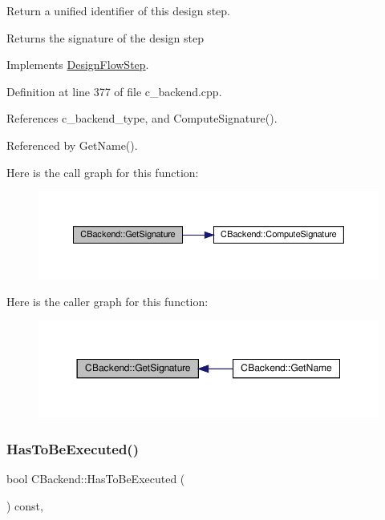Return a unified identifier of this design step. 

\begin{DoxyReturn}{Returns}
the signature of the design step 
\end{DoxyReturn}


Implements \hyperlink{classDesignFlowStep_ab111e3d4058615c2dedc0505978d4699}{Design\+Flow\+Step}.



Definition at line 377 of file c\+\_\+backend.\+cpp.



References c\+\_\+backend\+\_\+type, and Compute\+Signature().



Referenced by Get\+Name().

Here is the call graph for this function\+:
\nopagebreak
\begin{figure}[H]
\begin{center}
\leavevmode
\includegraphics[width=350pt]{d3/de2/classCBackend_aa66a47377656d5f70e26c4dd96de7ab6_cgraph}
\end{center}
\end{figure}
Here is the caller graph for this function\+:
\nopagebreak
\begin{figure}[H]
\begin{center}
\leavevmode
\includegraphics[width=350pt]{d3/de2/classCBackend_aa66a47377656d5f70e26c4dd96de7ab6_icgraph}
\end{center}
\end{figure}
\mbox{\label{classCBackend_a9cedb79a577526fabd2e396c6697eaf1}} 
\subsubsection{\texorpdfstring{Has\+To\+Be\+Executed()}{HasToBeExecuted()}}
{\footnotesize\ttfamily bool C\+Backend\+::\+Has\+To\+Be\+Executed (\begin{DoxyParamCaption}{ }\end{DoxyParamCaption}) const\hspace{0.3cm}{\ttfamily [override]}, {\ttfamily [virtual]}}



